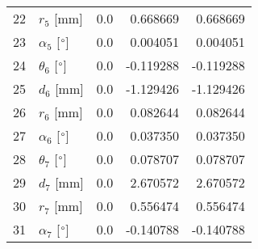 \documentclass{standalone}%
\begin{document}
\begin{tabular}{llrrr}
22 &              $r_{5}$ [mm] &       0.0 &   0.668669 &   0.668669 \\
23 &  $\alpha_{5}$ [$\degree$] &       0.0 &   0.004051 &   0.004051 \\
24 &  $\theta_{6}$ [$\degree$] &       0.0 &  -0.119288 &  -0.119288 \\
25 &              $d_{6}$ [mm] &       0.0 &  -1.129426 &  -1.129426 \\
26 &              $r_{6}$ [mm] &       0.0 &   0.082644 &   0.082644 \\
27 &  $\alpha_{6}$ [$\degree$] &       0.0 &   0.037350 &   0.037350 \\
28 &  $\theta_{7}$ [$\degree$] &       0.0 &   0.078707 &   0.078707 \\
29 &              $d_{7}$ [mm] &       0.0 &   2.670572 &   2.670572 \\
30 &              $r_{7}$ [mm] &       0.0 &   0.556474 &   0.556474 \\
31 &  $\alpha_{7}$ [$\degree$] &       0.0 &  -0.140788 &  -0.140788 \\
\bottomrule
\end{tabular}
%
\end{document}
